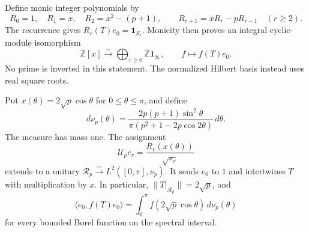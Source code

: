 Define monic integer polynomials by
\[
 R_0=1,\quad R_1=x,\quad R_2=x^2-(p+1),\qquad
 R_{r+1}=xR_r-pR_{r-1}\quad(r\geq2).
\]
The recurrence gives $R_r(T)e_0=\mathbf1_{S_r}$.
Monicity then proves an integral cyclic-module isomorphism
\begin{equation}
 \label{v4-arith:hecke:eq:integral-tree}
 \mathbb Z[x]\xrightarrow{\sim}
 \bigoplus_{r\geq0}\mathbb Z\mathbf1_{S_r},\qquad
 f\longmapsto f(T)e_0.
\end{equation}
No prime is inverted in this statement.
The normalized Hilbert basis instead uses real square roots.

\begin{theorem}
\label{v4-arith:hecke:thm:radial}
Put $x(\theta)=2\sqrt p\cos\theta$ for $0\leq\theta\leq\pi$, and define
\[
 d\nu_p(\theta)=
 \frac{2p(p+1)\sin^2\theta}
 {\pi(p^2+1-2p\cos2\theta)}\,d\theta.
\]
The measure has mass one. The assignment
\[
 \mathcal U_pe_r=\frac{R_r(x(\theta))}{\sqrt{s_r}}
\]
extends to a unitary $\mathcal R_p\xrightarrow{\sim}L^2([0,\pi],\nu_p)$.
It sends $e_0$ to $1$ and intertwines $T$ with multiplication by $x$.
In particular, $\|T|_{\mathcal R_p}\|=2\sqrt p$, and
\begin{equation}
 \label{v4-arith:hecke:eq:radial-state}
 \langle e_0,f(T)e_0\rangle
 =\int_0^\pi f(2\sqrt p\cos\theta)\,d\nu_p(\theta)
\end{equation}
for every bounded Borel function on the spectral interval.
\end{theorem}
